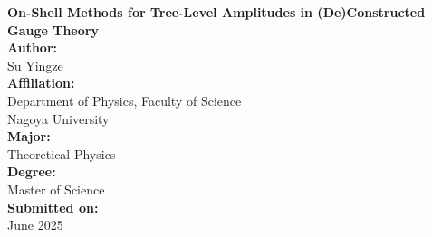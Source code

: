 \documentclass[12pt]{article}
\numberwithin{equation}{section}
\begin{document}
\begin{titlepage}
    \centering
    \vspace*{2cm}

    {\LARGE \textbf{On-Shell Methods for Tree-Level Amplitudes in (De)Constructed Gauge Theory}}\\[1.5cm]

    \textbf{Author:} \\
    {\Large Su Yingze} \\[1cm]

    \textbf{Affiliation:} \\
    Department of Physics, Faculty of Science \\
    Nagoya University \\[1cm]

    \textbf{Major:} \\
    Theoretical Physics \\[1cm]

    \textbf{Degree:} \\
    Master of Science \\[1cm]

    \textbf{Submitted on:} \\
    June 2025 \\[2cm]

    \vfill
\end{titlepage}
\newpage
\end{document}
